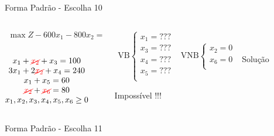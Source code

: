 \begin{frame}
{\begin{block}{Forma Padrão - {\color{cyan}Escolha 10}}
			\begin{columns}
				\begin{column}{0.35\textwidth}
					$
						\begin{matrix}
							\max Z - 600x_1 - 800x_2 = 0 \\
						\end{matrix}
					$ \\
					 \\
					$
						\begin{matrix}
							x_1  + {\color{red}\cancel{x_2}}  + x_3                   = 100 \\
							3x_1 + 2{\color{red}\cancel{x_2}}       + x_4             = 240 \\
							x_1                     + x_5       = 60 \\
							{\color{red}\cancel{x_2}}                          + {\color{red}\cancel{x_6}} = 80 \\
							x_1,x_2, x_3, x_4, x_5, x_6 \ge 0 \\
						\end{matrix}
					$
				\end{column}
				\vline
				\hspace{0.1cm}
				\begin{column}{0.45\textwidth}
						$
							\begin{matrix}
								\text{VB} \left\{  \begin{matrix}
																 x_1 = \text{???} \\
																 x_3 = \text{???} \\
																 x_4 = \text{???} \\
																 x_5 = \text{???} \\
												   \end{matrix} 
										   \right.
								&
								\text{VNB} \left\{  \begin{matrix}
																 x_2 = 0 \\
																 x_6 = 0 \\
												   \end{matrix} 
										   \right. 
								\\
							 & \\
							\end{matrix}
						$
						{\color{red}Solução Impossível !!!}
				\end{column}
			\end{columns}
		\end{block}
	}
	{
		\begin{block}{Forma Padrão - {\color{cyan}Escolha 11}}

\end{block}}
\end{frame}
